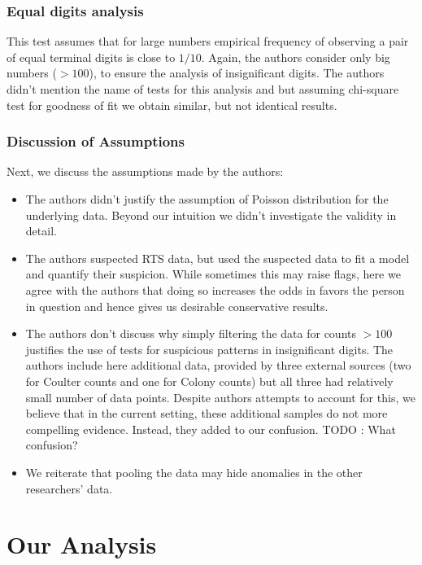 \documentclass{article}
\begin{document}
\subsubsection{Equal digits analysis}\label{equal-digits-analysis}

This test assumes that for large numbers empirical frequency of observing a
pair of equal terminal digits is close to $1/10$. Again, the
authors consider only big numbers ($>100$), to ensure the
analysis of insignificant digits. The authors didn't mention the name of tests for this analysis
and but assuming chi-square test for goodness of fit we obtain similar, but not identical results.



\subsubsection{Discussion of
Assumptions}\label{discussion-of-assumptions}

Next, we discuss the assumptions made by the authors:
\begin{itemize}
    \item The authors didn't justify the assumption of Poisson distribution for the underlying data. Beyond our intuition we didn't investigate the validity in detail.
    \item The authors suspected RTS data, but used the suspected data to fit a model and quantify their suspicion. While sometimes this may raise flags, here we agree with the authors that doing so increases the odds in favors the person in question and hence gives us desirable conservative results.
    \item The authors don't discuss why simply filtering the data for counts $>100$ justifies the use of tests for suspicious patterns in insignificant digits. The authors include here additional data, provided by three external sources (two for Coulter counts and one for Colony counts) but all three had relatively small number of data points.
    Despite authors attempts to account for this, we believe that in the current setting, these additional samples do not more compelling evidence. Instead, they added to our confusion. TODO : What confusion?
    \item We reiterate that pooling the data may hide anomalies in the other researchers' data.

\end{itemize}



    \section{Our Analysis}\label{our-analysis}
\end{document}
